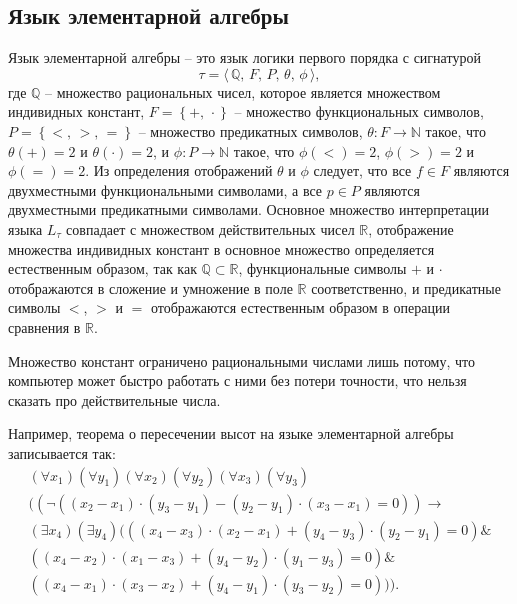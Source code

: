 \subsection{Язык элементарной алгебры}

Язык элементарной алгебры -- это язык логики первого порядка с сигнатурой
\begin{equation*}
    \tau = \langle \, \mathbb{Q},\, F,\, P,\, \theta,\, \phi \, \rangle,
\end{equation*}
где $\mathbb{Q}$ -- множество рациональных чисел, которое является множеством индивидных констант, $F =  \left\{+,\, \cdot\right\}$ -- множество функциональных символов, $P = \left\{ <,\, >,\, = \right\}$ -- множество предикатных символов, $\theta : F \rightarrow \mathbb{N}$ такое, что $\theta(+) = 2$ и $\theta(\cdot) = 2$, и $\phi : P \rightarrow \mathbb{N}$ такое, что $\phi(<) = 2$, $\phi(>) = 2$ и $\phi(=) = 2$. Из определения отображений $\theta$ и $\phi$ следует, что все $f \in F$ являются двухместными функциональными символами, а все $p \in P$ являются двухместными предикатными символами. Основное множество интерпретации языка $L_\tau $ совпадает с множеством действительных чисел $\mathbb{R}$, отображение множества индивидных констант в основное множество определяется естественным образом, так как $\mathbb{Q} \subset \mathbb{R}$, функциональные символы $+$ и $\cdot$ отображаются в сложение и умножение в поле $\mathbb{R}$ соответственно, и предикатные символы $<$, $>$ и $=$ отображаются естественным образом в операции сравнения в $\mathbb{R}$.

\begin{remark}
    Множество констант ограничено рациональными числами лишь потому, что компьютер может быстро работать с ними без потери точности, что нельзя сказать про действительные числа.
\end{remark}

Например, теорема о пересечении высот на языке элементарной алгебры записывается так:
\begin{gather*}
    (\forall x_1)(\forall y_1)(\forall x_2)(\forall y_2)(\forall x_3)(\forall y_3) \\
    (
        (
            \lnot
            (
                (x_2 - x_1)\cdot(y_3 - y_1) - (y_2 - y_1)\cdot(x_3 - x_1) = 0
            )
        )
        \to \\
        (\exists x_4)(\exists y_4)
        (
           (
                (x_4 - x_3)\cdot(x_2 - x_1) + (y_4 - y_3)\cdot(y_2 - y_1) = 0
            ) \& \\
            (
                (x_4 - x_2)\cdot(x_1 - x_3) + (y_4 - y_2)\cdot(y_1 - y_3) = 0
            ) \& \\
            (
                (x_4 - x_1)\cdot(x_3 - x_2) + (y_4 - y_1)\cdot(y_3 - y_2) = 0
            )
        )
    ).
\end{gather*}

